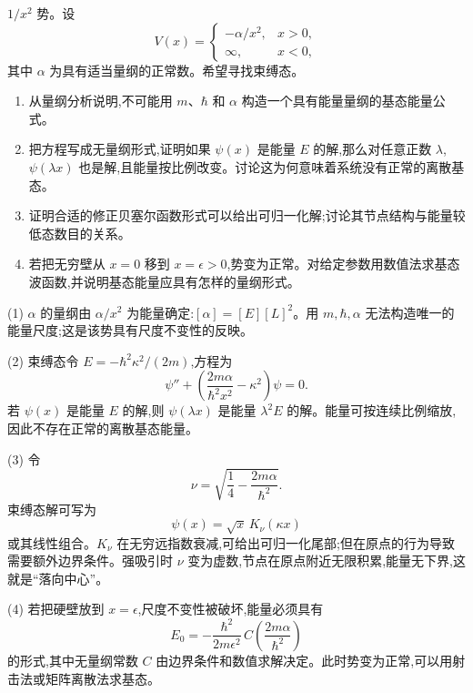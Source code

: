 \begin{question}
$1/x^2$ 势。设
\[
V(x)=\begin{cases}-\alpha/x^2,&x>0,\\ \infty,&x<0,
\end{cases}
\]
其中 $\alpha$ 为具有适当量纲的正常数。希望寻找束缚态。
\begin{enumerate}
\item 从量纲分析说明,不可能用 $m$、$\hbar$ 和 $\alpha$ 构造一个具有能量量纲的基态能量公式。
\item 把方程写成无量纲形式,证明如果 $\psi(x)$ 是能量 $E$ 的解,那么对任意正数 $\lambda$,$\psi(\lambda x)$ 也是解,且能量按比例改变。讨论这为何意味着系统没有正常的离散基态。
\item 证明合适的修正贝塞尔函数形式可以给出可归一化解;讨论其节点结构与能量较低态数目的关系。
\item 若把无穷壁从 $x=0$ 移到 $x=\epsilon>0$,势变为正常。对给定参数用数值法求基态波函数,并说明基态能量应具有怎样的量纲形式。
\end{enumerate}
\begin{solution}
(1) $\alpha$ 的量纲由 $\alpha/x^2$ 为能量确定:$[\alpha]=[E][L]^2$。用 $m,\hbar,\alpha$ 无法构造唯一的能量尺度;这是该势具有尺度不变性的反映。

(2) 束缚态令 $E=-\hbar^2\kappa^2/(2m)$,方程为
\[
\psi''+\left(\frac{2m\alpha}{\hbar^2x^2}-\kappa^2\right)\psi=0.
\]
若 $\psi(x)$ 是能量 $E$ 的解,则 $\psi(\lambda x)$ 是能量 $\lambda^2E$ 的解。能量可按连续比例缩放,因此不存在正常的离散基态能量。

(3) 令
\[
\nu=\sqrt{\frac14-\frac{2m\alpha}{\hbar^2}}.
\]
束缚态解可写为
\[
\psi(x)=\sqrt{x}\,K_\nu(\kappa x)
\]
或其线性组合。$K_\nu$ 在无穷远指数衰减,可给出可归一化尾部;但在原点的行为导致需要额外边界条件。强吸引时 $\nu$ 变为虚数,节点在原点附近无限积累,能量无下界,这就是“落向中心”。

(4) 若把硬壁放到 $x=\epsilon$,尺度不变性被破坏,能量必须具有
\[
E_0=-\frac{\hbar^2}{2m\epsilon^2}\,C\left(\frac{2m\alpha}{\hbar^2}\right)
\]
的形式,其中无量纲常数 $C$ 由边界条件和数值求解决定。此时势变为正常,可以用射击法或矩阵离散法求基态。
\end{solution}
\end{question}


